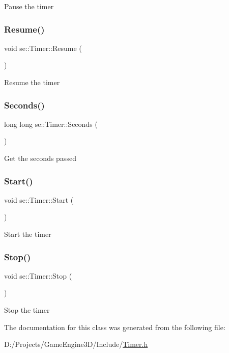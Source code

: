 Pause the timer \mbox{\label{classse_1_1_timer_a432406f463e02336c1033d65ae1d746e}} 
\subsubsection{\texorpdfstring{Resume()}{Resume()}}
{\footnotesize\ttfamily void se\+::\+Timer\+::\+Resume (\begin{DoxyParamCaption}{ }\end{DoxyParamCaption})}

Resume the timer \mbox{\label{classse_1_1_timer_a258761c48271338588503d8170532bde}} 
\subsubsection{\texorpdfstring{Seconds()}{Seconds()}}
{\footnotesize\ttfamily long long se\+::\+Timer\+::\+Seconds (\begin{DoxyParamCaption}{ }\end{DoxyParamCaption})}

Get the seconds passed \mbox{\label{classse_1_1_timer_a0294f5629a28a1e169a8d1b5ab179273}} 
\subsubsection{\texorpdfstring{Start()}{Start()}}
{\footnotesize\ttfamily void se\+::\+Timer\+::\+Start (\begin{DoxyParamCaption}{ }\end{DoxyParamCaption})}

Start the timer \mbox{\label{classse_1_1_timer_aed6b34f75ec989731c80fefe962493f3}} 
\subsubsection{\texorpdfstring{Stop()}{Stop()}}
{\footnotesize\ttfamily void se\+::\+Timer\+::\+Stop (\begin{DoxyParamCaption}{ }\end{DoxyParamCaption})}

Stop the timer 

The documentation for this class was generated from the following file\+:\begin{DoxyCompactItemize}
\item 
D\+:/\+Projects/\+Game\+Engine3\+D/\+Include/\mbox{\hyperlink{_timer_8h}{Timer.\+h}}\end{DoxyCompactItemize}
